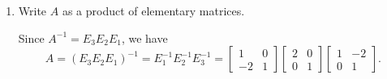\documentclass[12pt]{article}
\newcommand{\points}[1]{\marginpar{\hspace{24pt}[#1]}}
\begin{document}
\begin{enumerate}
\begin{enumerate}
\item Write $A$ as a product of elementary matrices. \points{2}


\bigskip

 Since $A^{-1}=E_3E_2E_1$, we have
\[
 A = (E_3E_2E_1)^{-1} = E_1^{-1}E_2^{-1}E_3^{-1} = \begin{bmatrix}1&0\\-2&1\end{bmatrix}\begin{bmatrix}2&0\\0&1\end{bmatrix}\begin{bmatrix}1&-2\\0&1\end{bmatrix}.
\]


\bigskip

\end{enumerate}
\end{enumerate}
\end{document}
